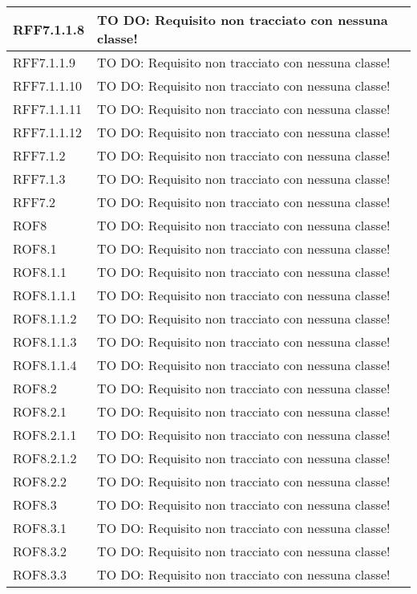 \begin{center}
\begin{longtable}{| p{2.5cm} | p{11cm} |}
\hline
RFF7.1.1.8 & TO DO: Requisito non tracciato con nessuna classe! \\
\hline
RFF7.1.1.9 & TO DO: Requisito non tracciato con nessuna classe! \\
\hline
RFF7.1.1.10 & TO DO: Requisito non tracciato con nessuna classe! \\
\hline
RFF7.1.1.11 & TO DO: Requisito non tracciato con nessuna classe! \\
\hline
RFF7.1.1.12 & TO DO: Requisito non tracciato con nessuna classe! \\
\hline
RFF7.1.2 & TO DO: Requisito non tracciato con nessuna classe! \\
\hline
RFF7.1.3 & TO DO: Requisito non tracciato con nessuna classe! \\
\hline
RFF7.2 & TO DO: Requisito non tracciato con nessuna classe! \\
\hline
ROF8 & TO DO: Requisito non tracciato con nessuna classe! \\
\hline
ROF8.1 & TO DO: Requisito non tracciato con nessuna classe! \\
\hline
ROF8.1.1 & TO DO: Requisito non tracciato con nessuna classe! \\
\hline
ROF8.1.1.1 & TO DO: Requisito non tracciato con nessuna classe! \\
\hline
ROF8.1.1.2 & TO DO: Requisito non tracciato con nessuna classe! \\
\hline
ROF8.1.1.3 & TO DO: Requisito non tracciato con nessuna classe! \\
\hline
ROF8.1.1.4 & TO DO: Requisito non tracciato con nessuna classe! \\
\hline
ROF8.2 & TO DO: Requisito non tracciato con nessuna classe! \\
\hline
ROF8.2.1 & TO DO: Requisito non tracciato con nessuna classe! \\
\hline
ROF8.2.1.1 & TO DO: Requisito non tracciato con nessuna classe! \\
\hline
ROF8.2.1.2 & TO DO: Requisito non tracciato con nessuna classe! \\
\hline
ROF8.2.2 & TO DO: Requisito non tracciato con nessuna classe! \\
\hline
ROF8.3 & TO DO: Requisito non tracciato con nessuna classe! \\
\hline
ROF8.3.1 & TO DO: Requisito non tracciato con nessuna classe! \\
\hline
ROF8.3.2 & TO DO: Requisito non tracciato con nessuna classe! \\
\hline
ROF8.3.3 & TO DO: Requisito non tracciato con nessuna classe! \\

\end{longtable}
\end{center}
